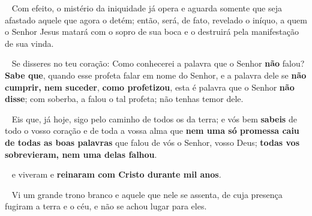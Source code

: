 \documentclass[12pt,aspectratio=169]{beamer}
\newcommand{\ver}[1]{%
    \raisebox{0.50ex}{%
        \scalebox{1.1}{%
            \pmb{\textbf{\textcolor{BSpbg}{#1}}}%
        }%
    }%
}
\newcommand{\QUOTE}[1]{%
    \par\noindent\hspace*{0.1\linewidth}%
    \begin{minipage}{0.8\linewidth}%
        \linespread{1.35}\large{#1}%
    \end{minipage}%
}
\newcommand{\RED}[1]{{\textcolor{TXred}{#1}}}
\newcommand{\ORA}[1]{{\textcolor{TXora}{#1}}}
\newcommand{\YEL}[1]{{\textcolor{TXyel}{#1}}}
\newcommand{\GRE}[1]{{\textcolor{TXgre}{#1}}}
\newcommand{\CYA}[1]{{\textcolor{TXcya}{#1}}}
\newcommand{\MAG}[1]{{\textcolor{TXmag}{#1}}}
\newcommand{\BRI}[1]{{\textcolor{BSpbg}{#1}}}   %
\begin{document}
    \begin{frame}
        \QUOTE{%
            \ver{(ARA) 2Ts~2.7,8}~%
            Com efeito, o \RED{mistério da iniquidade} já opera e \YEL{aguarda somente}  que
            \GRE{seja afastado} aquele que \GRE{agora o detém}; \MAG{então, será,  de  fato,
            revelado} o \RED{iníquo}, a quem o Senhor Jesus matará com o sopro de sua boca e
            o destruirá pela manifestação de sua vinda.
        }
    \end{frame}

    \begin{frame}
        \QUOTE{%
            \ver{(ARA) Dt~18.21,22}~%
            Se disseres no  teu  coração:  \YEL{Como  conhecerei  a  palavra  que  o  Senhor
            \textbf{não} falou}? \MAG{\textbf{Sabe que}}, quando esse \ORA{profeta falar  em
            nome do Senhor}, e a palavra dele se \GRE{\textbf{não  cumprir,  nem  suceder}},
            \CYA{\textbf{como profetizou}}, \MAG{esta é palavra  que  o  Senhor  \textbf{não
            disse}}; com \ORA{soberba}, a falou o tal profeta; \ORA{não tenhas temor dele}.
        }
    \end{frame}

    \begin{frame}
        \QUOTE{%
            \ver{(ARA) Js~23.14}~%
            Eis que,  já  hoje,  sigo  pelo  caminho  de  todos  os  da  terra;  e  vós  bem
            \YEL{\textbf{sabeis} de todo o vosso  coração  e  de  toda  a  vossa  alma}  que
            \GRE{\textbf{nem uma só promessa caiu de todas as boas palavras}} que  falou  de
            vós o Senhor, vosso Deus; \MAG{\textbf{todas  vos  sobrevieram,  nem  uma  delas
            falhou}}.
        }
    \end{frame}

    \begin{frame}
        \QUOTE{%
            \ver{(ARA) Ap~20.4}~%
            e \BRI{viveram e \textbf{reinaram com Cristo durante mil anos}}.
        }
    \end{frame}

    \begin{frame}
        \QUOTE{%
            \ver{(ARA) Ap~20.11}~%
            Vi um \BRI{grande trono branco} e \BRI{aquele que  nele  se  assenta},  de  cuja
            presença \YEL{fugiram} a \GRE{terra} e o \CYA{céu}, e \MAG{não  se  achou  lugar
            para eles}.
        }
    \end{frame}
\end{document}
